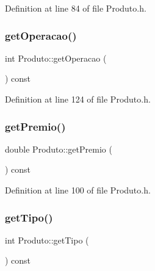 Definition at line 84 of file Produto.\+h.

\hypertarget{class_produto_aa2439688c906f40ceba801416997ee52}{}\label{class_produto_aa2439688c906f40ceba801416997ee52} 
\subsubsection{\texorpdfstring{get\+Operacao()}{getOperacao()}}
{\footnotesize\ttfamily int Produto\+::get\+Operacao (\begin{DoxyParamCaption}{ }\end{DoxyParamCaption}) const\hspace{0.3cm}{\ttfamily [inline]}}



Definition at line 124 of file Produto.\+h.

\hypertarget{class_produto_a5edbfd3bad58f247d3505ee10ccba1ea}{}\label{class_produto_a5edbfd3bad58f247d3505ee10ccba1ea} 
\subsubsection{\texorpdfstring{get\+Premio()}{getPremio()}}
{\footnotesize\ttfamily double Produto\+::get\+Premio (\begin{DoxyParamCaption}{ }\end{DoxyParamCaption}) const\hspace{0.3cm}{\ttfamily [inline]}}



Definition at line 100 of file Produto.\+h.

\hypertarget{class_produto_ac8952f93cd5f2887e393664426b1dbfd}{}\label{class_produto_ac8952f93cd5f2887e393664426b1dbfd} 
\subsubsection{\texorpdfstring{get\+Tipo()}{getTipo()}}
{\footnotesize\ttfamily int Produto\+::get\+Tipo (\begin{DoxyParamCaption}{ }\end{DoxyParamCaption}) const\hspace{0.3cm}{\ttfamily [inline]}}



